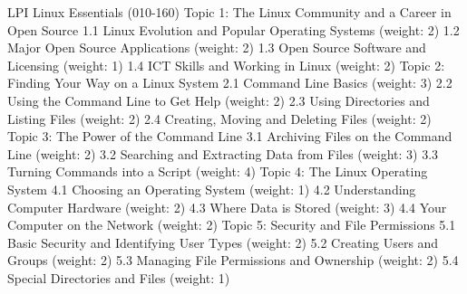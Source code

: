 LPI Linux Essentials (010-160)
Topic 1: The Linux Community and a Career in Open Source
1.1 Linux Evolution and Popular Operating Systems (weight: 2)
1.2 Major Open Source Applications (weight: 2)
1.3 Open Source Software and Licensing (weight: 1)
1.4 ICT Skills and Working in Linux (weight: 2)
Topic 2: Finding Your Way on a Linux System
2.1 Command Line Basics (weight: 3)
2.2 Using the Command Line to Get Help (weight: 2)
2.3 Using Directories and Listing Files (weight: 2)
2.4 Creating, Moving and Deleting Files (weight: 2)
Topic 3: The Power of the Command Line
3.1 Archiving Files on the Command Line (weight: 2)
3.2 Searching and Extracting Data from Files (weight: 3)
3.3 Turning Commands into a Script (weight: 4)
Topic 4: The Linux Operating System
4.1 Choosing an Operating System (weight: 1)
4.2 Understanding Computer Hardware (weight: 2)
4.3 Where Data is Stored (weight: 3)
4.4 Your Computer on the Network (weight: 2)
Topic 5: Security and File Permissions
5.1 Basic Security and Identifying User Types (weight: 2)
5.2 Creating Users and Groups (weight: 2)
5.3 Managing File Permissions and Ownership (weight: 2)
5.4 Special Directories and Files (weight: 1)

